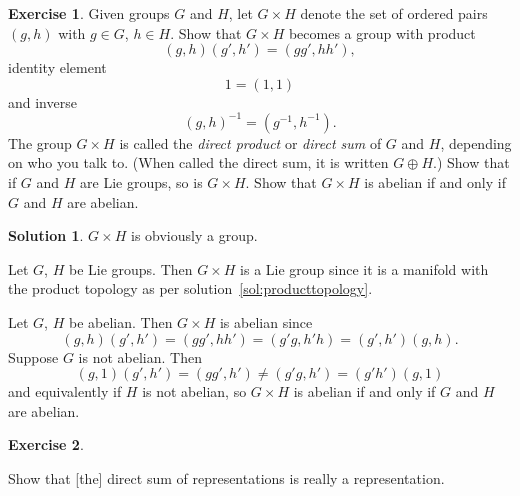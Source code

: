 \documentclass[11pt, a4paper]{report}
\theoremstyle{definition}
\newtheorem{ex}{Exercise}[part]
\newtheorem{sol}{Solution}[part]
\begin{document}
\begin{ex}

Given groups $G$ and $H$, let $G \times H$ denote the set of ordered pairs $(g, h)$ with $g \in G$, $h \in H$.
Show that $G \times H$ becomes a group with product
\[
    (g, h) (g', h') = (gg', hh'),
\]
identity element
\[
    1 = (1, 1)
\]
and inverse
\[
    {(g, h)}^{-1} = (g^{-1}, h^{-1}).
\]
The group $G \times H$ is called the \emph{direct product} or \emph{direct sum} of $G$ and $H$, depending on who you talk to.
(When called the direct sum, it is written $G \oplus H$.)
Show that if $G$ and $H$ are Lie groups, so is $G \times H$.
Show that $G \times H$ is abelian if and only if $G$ and $H$ are abelian.

\end{ex}

\begin{sol}

$G \times H$ is obviously a group.

Let $G$, $H$ be Lie groups.
Then $G \times H$ is a Lie group since it is a manifold with the product topology as per solution~\ref{sol:producttopology}.

Let $G$, $H$ be abelian. Then $G \times H$ is abelian since
\[
    (g, h) (g', h') = (gg', hh') = (g'g, h'h) = (g', h')(g, h).
\]
Suppose $G$ is not abelian. Then
\[
    (g, 1) (g', h') = (gg', h') \neq (g'g, h') = (g' h')(g, 1)
\]
and equivalently if $H$ is not abelian, so $G \times H$ is abelian if and only if $G$ and $H$ are abelian.

\end{sol}

\begin{ex}\label{ex:directsumrepresentation}

Show that [the] direct sum of representations is really a representation.

\end{ex}
\end{document}
